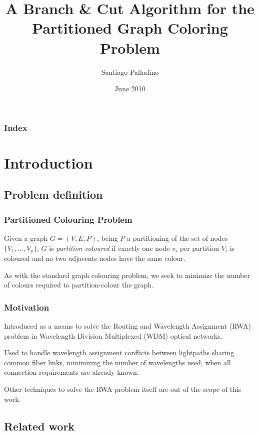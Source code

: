 \documentclass{beamer}
\begin{document}
\title{A Branch \& Cut Algorithm for the Partitioned Graph Coloring Problem}
\author{Santiago Palladino}
\date{June 2010}

\begin{frame}
\titlepage
\end{frame}

\begin{frame}
\frametitle{Index}
\tableofcontents
\end{frame} 

\setlength{\parskip}{10pt plus 1pt minus 1pt}

\section{Introduction}
\subsection{Problem definition}

\begin{frame}
\frametitle{Partitioned Colouring Problem}

\begin{definition}
Given a graph $G=(V,E,P)$, being $P$ a partitioning of the set of nodes $\{V_1,\ldots,V_p\}$, $G$ is \textit{partition coloured} if exactly one node $v_i$ per partition $V_i$ is coloured and no two adjacents nodes have the same colour.
\end{definition}

As with the standard graph colouring problem, we seek to minimize the number of colours required to partition-colour the graph.

\end{frame} 

\begin{frame} 
\frametitle{Motivation}

Introduced as a means to solve the Routing and Wavelength Assignment (RWA) problem in Wavelength Division Multiplexed (WDM) optical networks.

Used to handle wavelength assignment conflicts between lightpaths sharing common fiber links, minimizing the number of wavelengths used, when all connection requirements are already known.

Other techniques to solve the RWA problem itself are out of the scope of this work.

\end{frame} 

\subsection{Related work}
\end{document}
